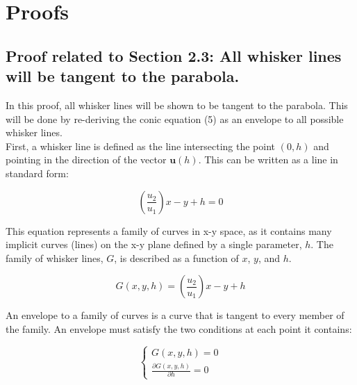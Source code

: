\documentclass[11pt]{article}
\begin{document}
\section{Proofs}

    \subsection{Proof related to Section 2.3:  All whisker lines will be tangent to the parabola.}
        In this proof, all whisker lines will be shown to be tangent to the parabola. This will be done by re-deriving the conic equation (5) as an envelope to all possible whisker lines. \\
        
        First, a whisker line is defined as the line intersecting the point $(0,h)$ and pointing in the direction of the vector $\boldsymbol{u}(h)$. This can be written as a line in standard form: 

        \begin{equation}
          \left(\frac{u_2}{u_1}\right) x - y + h = 0
          \label{eq:Eq32}
        \end{equation}
    
        This equation represents a family of curves in x-y space, as it contains many implicit curves (lines) on the x-y plane defined by a single parameter, $h$. The family of whisker lines, $G$, is described as a function of $x$, $y$, and $h$. 
        
        \begin{equation}
          G(x,y,h) = \left(\frac{u_2}{u_1}\right) x - y + h
          \label{eq:Eq33}
        \end{equation}
    
        An envelope to a family of curves is a curve that is tangent to every member of the family. An envelope must satisfy the two conditions at each point it contains:
        
        \begin{equation}
          \left\{
          \begin{array}{l}
            G(x,y,h) = 0 \\
            \frac{\partial G(x,y,h)}{\partial{h}} = 0
          \end{array}
          \right.
          \label{eq:Eq34}
        \end{equation}
    
\end{document}
